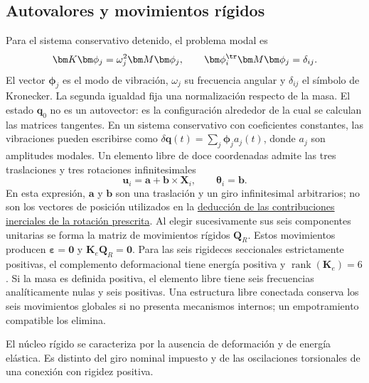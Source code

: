 \subsection{Autovalores y movimientos rígidos}
Para el sistema conservativo detenido, el problema modal es
\begin{equation}
\bm K\bm\phi_j=\omega_j^2\bm M\bm\phi_j,\qquad
\bm\phi_i^\tr\bm M\bm\phi_j=\delta_{ij}.
\end{equation}
El vector $\bm\phi_j$ es el modo de vibración, $\omega_j$ su frecuencia angular y $\delta_{ij}$ el símbolo de Kronecker. La segunda igualdad fija una normalización respecto de la masa. El estado $\bm q_0$ no es un autovector: es la configuración alrededor de la cual se calculan las matrices tangentes. En un sistema conservativo con coeficientes constantes, las vibraciones pueden escribirse como $\delta\bm q(t)=\sum_j\bm\phi_j a_j(t)$, donde $a_j$ son amplitudes modales.
Un elemento libre de doce coordenadas admite las tres traslaciones y tres rotaciones infinitesimales
\begin{equation}
\bm u_i=\bm a+\bm b\times\bm X_i,\qquad \bm\theta_i=\bm b.
\label{eq:rigid}
\end{equation}
En esta expresión, $\bm a$ y $\bm b$ son una traslación y un giro infinitesimal arbitrarios; no son los vectores de posición utilizados en la \hyperref[sec:giro]{deducción de las contribuciones inerciales de la rotación prescrita}. Al elegir sucesivamente sus seis componentes unitarias se forma la matriz de movimientos rígidos $\bm Q_R$. Estos movimientos producen $\bm\varepsilon=\bm0$ y $\bm K_e\bm Q_R=\bm0$. Para las seis rigideces seccionales estrictamente positivas, el complemento deformacional tiene energía positiva y $\operatorname{rank}(\bm K_e)=6$. Si la masa es definida positiva, el elemento libre tiene seis frecuencias analíticamente nulas y seis positivas. Una estructura libre conectada conserva los seis movimientos globales si no presenta mecanismos internos; un empotramiento compatible los elimina.

El núcleo rígido se caracteriza por la ausencia de deformación y de energía elástica. Es distinto del giro nominal impuesto y de las oscilaciones torsionales de una conexión con rigidez positiva.

